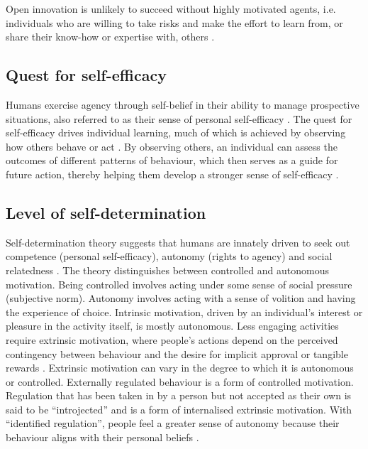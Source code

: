 Open innovation is unlikely to succeed without highly motivated agents, i.e. individuals who are willing to take risks and make the effort to learn from, or share their know-how or expertise with, others \citep{nonaka1994dynamic,leonard1998role,bock2005behavioral}. 

\subsection{Quest for self-efficacy}

Humans exercise agency through self-belief in their ability to manage prospective situations, also referred to as their sense of personal self-efficacy \citep{white1959motivation, bandura1994self}. The quest for self-efficacy drives individual learning, much of which is achieved by observing how others behave or act \citep{bandura1986social}. By observing others, an individual can assess the outcomes of different patterns of behaviour, which then serves as a guide for future action, thereby helping them develop a stronger sense of self-efficacy \citep{bandura1977self,bandura1999social}. 

\subsection{Level of self-determination}

Self-determination theory suggests that humans are innately driven to seek out competence (personal self-efficacy), autonomy (rights to agency) and social relatedness \citep{ryan2000self}. The theory distinguishes between controlled and autonomous motivation. Being controlled involves acting under some sense of social pressure (subjective norm). Autonomy involves acting with a sense of volition and having the experience of choice. Intrinsic motivation, driven by an individual's interest or pleasure in the activity itself, is mostly autonomous. Less engaging activities require extrinsic motivation, where people's actions depend on the perceived contingency between behaviour and the desire for implicit approval or tangible rewards \citep{gagne2005self}. Extrinsic motivation can vary in the degree to which it is autonomous or controlled. Externally regulated behaviour is a form of controlled motivation. Regulation that has been taken in by a person but not accepted as their own is said to be \enquote{introjected} and is a form of internalised extrinsic motivation. With \enquote{identified regulation}, people feel a greater sense of autonomy because their behaviour aligns with their personal beliefs \citep{gagne2005self}. \medskip

